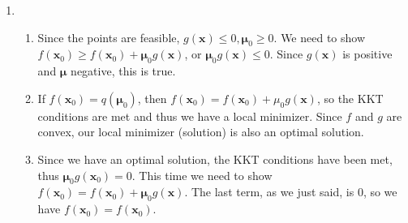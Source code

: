 \documentclass{article}
\begin{document}
\begin{enumerate}
\begin{enumerate}
		\end{enumerate}
	\item
		\begin{enumerate}
			\item Since the points are feasible, $g(\boldsymbol{x}) \le 0, \boldsymbol{\mu}_0 \ge 0$. We need to show $f(\boldsymbol{x}_0) \ge f(\boldsymbol{x}_0) + \boldsymbol{\mu}_0 g(\boldsymbol{x})$, or $\boldsymbol{\mu}_0 g(\boldsymbol{x}) \le 0$. Since $g(\boldsymbol{x})$ is positive and $\boldsymbol{\mu}$ negative, this is true.
			\item If $f(\boldsymbol{x}_0) = q(\boldsymbol{\mu}_0)$, then $f(\boldsymbol{x}_0) = f(\boldsymbol{x}_0) + \mu_0 g(\boldsymbol{x})$, so the KKT conditions are met and thus we have a local minimizer. Since $f$ and $g$ are convex, our local minimizer (solution) is also an optimal solution.
			\item Since we have an optimal solution, the KKT conditions have been met, thus $\boldsymbol{\mu}_0 g(\boldsymbol{x}_0) = 0$. This time we need to show $f(\boldsymbol{x}_0) = f(\boldsymbol{x}_0) + \boldsymbol{\mu}_0 g(\boldsymbol{x})$. The last term, as we just said, is 0, so we have $f(\boldsymbol{x}_0) = f(\boldsymbol{x}_0)$.
		\end{enumerate}
\end{enumerate}
\end{document}

